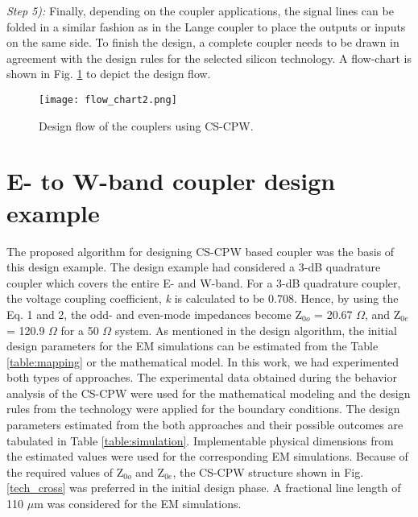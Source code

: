 \documentclass[journal]{IEEEtran}
\begin{document}
\textit{Step 5):} Finally, depending on the coupler applications, the signal lines can be folded in a similar fashion as in the Lange coupler to place the outputs or inputs on the same side. To finish the design, a complete coupler needs to be drawn in agreement with the design rules for the selected silicon technology. A flow-chart is shown in Fig. \ref{flow_chart} to depict the design flow.

\begin{figure}
	\texttt{[image: flow\_chart2.png]}
	\caption{Design flow of the couplers using CS-CPW.}
	\label{flow_chart}
\end{figure}


\section{E- to W-band coupler design example}
The proposed algorithm for designing CS-CPW based coupler was the basis of this design example. The design example had considered a 3-dB quadrature coupler which covers the entire E- and W-band. For a 3-dB quadrature coupler, the voltage coupling coefficient, \textit{k} is calculated to be 0.708. Hence, by using the Eq. 1 and 2, the odd- and even-mode impedances become Z$_{0o}$ = 20.67 $\Omega$, and Z$_{0e}$ = 120.9 $\Omega$ for a 50 $\Omega$ system. As mentioned in the design algorithm, the initial design parameters for the EM simulations can be estimated from the Table \ref{table:mapping} or the mathematical model. In this work, we had experimented both types of approaches. The experimental data obtained during the behavior analysis of the CS-CPW were used for the mathematical modeling and the design rules from the technology were applied for the boundary conditions. The design parameters estimated from the both approaches and their possible outcomes are tabulated in Table \ref{table:simulation}. Implementable physical dimensions from the estimated values were used for the corresponding EM simulations. Because of the required values of Z$_{0o}$ and Z$_{0e}$, the CS-CPW structure shown in Fig. \ref{tech_cross} was preferred in the initial design phase. A fractional line length of 110 $\mu$m was considered for the EM simulations.
\end{document}
